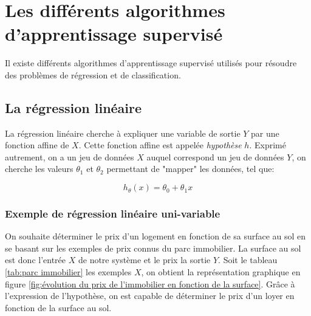 \section{Les différents algorithmes d'apprentissage supervisé}
\label{Le Machine Learning:Les différents algorithmes d'apprentissage supervisé}
Il existe différents algorithmes d'apprentissage supervisé utilisés pour résoudre des problèmes de régression et de classification. 

\subsection{La régression linéaire}
\label{Le Machine Learning:Les différents algorithmes d'apprentissage supervisé: La regression linéaire}
La régression linéaire cherche à expliquer une variable de sortie $Y$ par une fonction affine de $X$. Cette fonction affine est appelée \emph{hypothèse} $h$. Exprimé autrement, on a un jeu de données $X$ auquel correspond un jeu de données $Y$, on cherche les valeurs $\theta_1$ et $\theta_2$ permettant de "mapper" les données, tel que:

\begin{equation}
	h_\theta (x) = \theta_0 + \theta_1 x
\end{equation}

\subsubsection{Exemple de régression linéaire uni-variable}
\label{Le Machine Learning:Les différents algorithmes d'apprentissage supervisé: La regression linéaire: Exemple de régression linéaire uni-variable}
On souhaite déterminer le prix d'un logement en fonction de sa surface au sol en se basant sur les exemples de prix connus du parc immobilier. 
La surface au sol est donc l'entrée $X$ de notre système et le prix la sortie $Y$. Soit le tableau \ref {tab:parc immobilier} les exemples $X$, on obtient la représentation graphique en figure 	\ref{fig:évolution du prix de l'immobilier en fonction de la surface}. Grâce à l'expression de l'hypothèse, on est capable de déterminer le prix d'un loyer en fonction de la surface au sol.  

